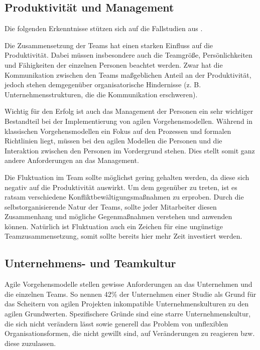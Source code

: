 \subsection{Produktivität und Management} %

Die folgenden Erkenntnisse stützen sich auf die Fallstudien aus \parencite[][S. 418 ff.]{DeO.Melo:2013:ICS:2400747.2401010}.

Die Zusammensetzung der Teams hat einen starken Einfluss auf die Produktivität.
Dabei müssen insbesondere auch die Teamgröße, Persönlichkeiten und Fähigkeiten der einzelnen Personen beachtet werden.
Zwar hat die Kommunikation zwischen den Teams maßgeblichen Anteil an der Produktivität, jedoch stehen demgegenüber organisatorische Hindernisse (z. B. Unternehmensstrukturen, die die Kommunikation erschweren).

Wichtig für den Erfolg ist auch das Management der Personen ein sehr wichtiger Bestandteil bei der Implementierung von agilen Vorgehensmodellen.
Während in klassischen Vorgehensmodellen ein Fokus auf den Prozessen und formalen Richtlinien liegt, müssen bei den agilen Modellen die Personen und die Interaktion zwischen den Personen im Vordergrund stehen.
Dies stellt somit ganz andere Anforderungen an das Management.

Die Fluktuation im Team sollte möglichst gering gehalten werden, da diese sich negativ auf die Produktivität auswirkt. 
Um dem gegenüber zu treten, ist es ratsam verschiedene Konfliktbewältigungsmaßnahmen zu erproben.
Durch die selbstorganisierende Natur der Teams, sollte jeder Mitarbeiter diesen Zusammenhang und mögliche Gegenmaßnahmen verstehen und anwenden können.
Natürlich ist Fluktuation auch ein Zeichen für eine ungünstige Teamzusammensetzung, somit sollte bereits hier mehr Zeit investiert werden.

\subsection{Unternehmens- und Teamkultur} %

Agile Vorgehensmodelle stellen gewisse Anforderungen an das Unternehmen und die einzelnen Teams.
So nennen 42\% der Unternehmen einer Studie als Grund für das Scheitern von agilen Projekten inkompatible Unternehmenskulturen zu den agilen Grundwerten. 
Spezifischere Gründe sind eine starre Unternehmenskultur, die sich nicht verändern lässt sowie generell das Problem von unflexiblen Organisationsformen, die nicht gewillt sind, auf Veränderungen zu reagieren bzw. diese zuzulassen.
\parencite[Vgl.][S. 10]{VersionOne:2015aa}

